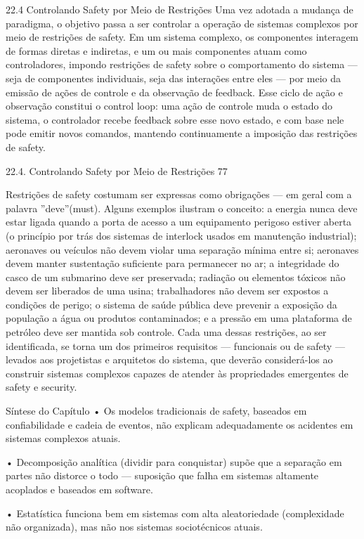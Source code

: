 22.4 Controlando Safety por Meio de Restrições Uma vez adotada a mudança de paradigma, o objetivo passa a ser controlar a operação de sistemas complexos por meio de restrições de safety. Em um sistema complexo, os componentes interagem de formas diretas e indiretas, e um ou mais componentes atuam como controladores, impondo restrições de safety sobre o comportamento do sistema — seja de componentes individuais, seja das interações entre eles — por meio da emissão de ações de controle e da observação de feedback. Esse ciclo de ação e observação constitui o control loop: uma ação de controle muda o estado do sistema, o controlador recebe feedback sobre esse novo estado, e com base nele pode emitir novos comandos, mantendo continuamente a imposição das restrições de safety.

22.4. Controlando Safety por Meio de Restrições 77

Restrições de safety costumam ser expressas como obrigações — em geral com a palavra ”deve”(must). Alguns exemplos ilustram o conceito: a energia nunca deve estar ligada quando a porta de acesso a um equipamento perigoso estiver aberta (o princípio por trás dos sistemas de interlock usados em manutenção industrial); aeronaves ou veículos não devem violar uma separação mínima entre si; aeronaves devem manter sustentação suficiente para permanecer no ar; a integridade do casco de um submarino deve ser preservada; radiação ou elementos tóxicos não devem ser liberados de uma usina; trabalhadores não devem ser expostos a condições de perigo; o sistema de saúde pública deve prevenir a exposição da população a água ou produtos contaminados; e a pressão em uma plataforma de petróleo deve ser mantida sob controle. Cada uma dessas restrições, ao ser identificada, se torna um dos primeiros requisitos — funcionais ou de safety — levados aos projetistas e arquitetos do sistema, que deverão considerá-los ao construir sistemas complexos capazes de atender às propriedades emergentes de safety e security.

Síntese do Capítulo • Os modelos tradicionais de safety, baseados em confiabilidade e cadeia de eventos, não explicam adequadamente os acidentes em sistemas complexos atuais.

• Decomposição analítica (dividir para conquistar) supõe que a separação em partes não distorce o todo — suposição que falha em sistemas altamente acoplados e baseados em software.

• Estatística funciona bem em sistemas com alta aleatoriedade (complexidade não organizada), mas não nos sistemas sociotécnicos atuais.

